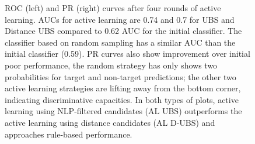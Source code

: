 \begin{figure}
\begin{minipage}[b]{.4\textwidth}
\captionsetup{labelformat=empty}
\label{fig:prcs_round5}
\end{minipage}
\caption{ROC (left) and PR (right) curves after four rounds of active learning. 
AUCs for active learning are 0.74 and 0.7 for UBS and Distance UBS compared to 0.62 AUC for the initial classifier.
The classifier based on random sampling has a similar AUC than the initial classifier (0.59).
PR curves also show improvement over initial poor performance,
the random strategy has only shows two probabilities for target and non-target predictions; 
the other two active learning strategies are lifting away from the bottom corner, indicating discriminative capacities.
In both types of plots, active learning using NLP-filtered candidates (AL UBS) outperforms the active learning using distance candidates (AL D-UBS) and approaches rule-based performance.
}\label{fig:rocs_prcs_round5}
\end{figure}

